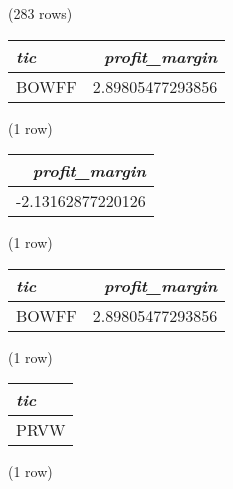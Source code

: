 \noindent (283 rows) \\

\begin{tabular}{l | r}
\textit{tic} & \textit{profit\_margin} \\
\hline
BOWFF & 2.89805477293856 \\
\end{tabular}

\noindent (1 row) \\

\begin{tabular}{r}
\textit{profit\_margin} \\
\hline
-2.13162877220126 \\
\end{tabular}

\noindent (1 row) \\

\begin{tabular}{l | r}
\textit{tic} & \textit{profit\_margin} \\
\hline
BOWFF & 2.89805477293856 \\
\end{tabular}

\noindent (1 row) \\

\begin{tabular}{l}
\textit{tic} \\
\hline
PRVW \\
\end{tabular}

\noindent (1 row) \\

